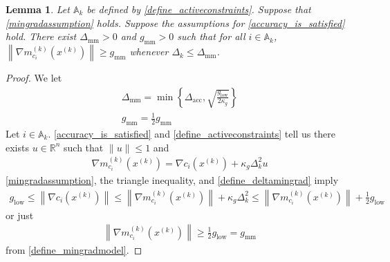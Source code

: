 \documentclass{article}
\newtheorem{lemma}[theorem]{Lemma}
\theoremstyle{case}
\numberwithin{theorem}{subsection}
\newcommand{\activeconstraintsk}{{\mathbb A_{k}}}
\newcommand{\dacc}{{\Delta_{\textrm{acc}}}}
\newcommand{\dk}{\Delta_k}
\newcommand{\gmcik}{{\nabla m_{c_i}^{(k)}\left(\xk\right)}}
\newcommand{\mingrad}{{ g_{\textrm{low}} }}
\newcommand{\Rn}{\mathbb R^n}
\newcommand{\xk}{{x^{(k)}}}
\newcommand{\deltamingrad}{{\Delta_{\textrm{mm}}}}
\newcommand{\mingradmodel}{{ g_{\textrm{mm}} }}
\begin{document}
\begin{lemma}
Let $\activeconstraintsk$ be defined by \cref{define_activeconstraints}.
Suppose that \cref{mingradassumption} holds.
Suppose the assumptions for \cref{accuracy_is_satisfied} hold.
There exist $\deltamingrad > 0$ and $\mingradmodel > 0$ such that for all $i \in \activeconstraintsk$, 
 $\left\|\gmcik\right\| \ge \mingradmodel $ whenever $\dk \le \deltamingrad$.
\end{lemma}
\begin{proof}
We let
\begin{align}
\deltamingrad = \min\left\{\dacc, \sqrt{\frac{\mingrad}{2\kappa_g}}\right\} \label{define_deltamingrad} \\
\mingradmodel = \frac 1 2 \mingradmodel \label{define_mingradmodel}
\end{align}
Let $i \in \activeconstraintsk$.
\cref{accuracy_is_satisfied} and \cref{define_activeconstraints} tell us there exists $u \in \Rn$ such that $\|u\| \le 1$ and
\begin{align*}
\gmcik = \nabla c_i\left(\xk\right) + \kappa_g \dk^2 u
\end{align*}
\cref{mingradassumption}, the triangle inequality, and \cref{define_deltamingrad} imply
\begin{align*}
\mingrad \le \left\|\nabla c_i\left(\xk\right)\right\| \le \left\|\gmcik\right\| + \kappa_g \dk^2 \le \left\|\gmcik\right\| + \frac 1 2 \mingrad
\end{align*}
or just
\begin{align*}
\left\|\gmcik\right\| \ge \frac 1 2 \mingrad = \mingradmodel
\end{align*}
from \cref{define_mingradmodel}.


\end{proof}
\end{document}
